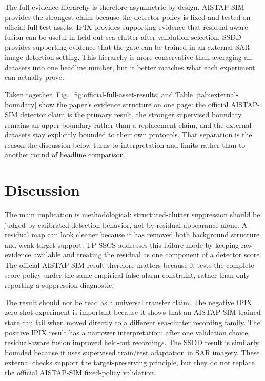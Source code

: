 \documentclass[journal]{IEEEtran}
\begin{document}
The full evidence hierarchy is therefore asymmetric by design. AISTAP-SIM provides the strongest claim because the detector policy is fixed and tested on official full-test assets. IPIX provides supporting evidence that residual-aware fusion can be useful in held-out sea clutter after validation selection. SSDD provides supporting evidence that the gate can be trained in an external SAR-image detection setting. This hierarchy is more conservative than averaging all datasets into one headline number, but it better matches what each experiment can actually prove.

Taken together, Fig.~\ref{fig:official-full-asset-results} and Table~\ref{tab:external-boundary} show the paper's evidence structure on one page: the official AISTAP-SIM detector claim is the primary result, the stronger supervised boundary remains an upper boundary rather than a replacement claim, and the external datasets stay explicitly bounded to their own protocols. That separation is the reason the discussion below turns to interpretation and limits rather than to another round of headline comparison.

\section{Discussion}

The main implication is methodological: structured-clutter suppression should be judged by calibrated detection behavior, not by residual appearance alone. A residual map can look cleaner because it has removed both background structure and weak target support. TP-SSCS addresses this failure mode by keeping raw evidence available and treating the residual as one component of a detector score. The official AISTAP-SIM result therefore matters because it tests the complete score policy under the same empirical false-alarm constraint, rather than only reporting a suppression diagnostic.

The result should not be read as a universal transfer claim. The negative IPIX zero-shot experiment is important because it shows that an AISTAP-SIM-trained state can fail when moved directly to a different sea-clutter recording family. The positive IPIX result has a narrower interpretation: after one validation choice, residual-aware fusion improved held-out recordings. The SSDD result is similarly bounded because it uses supervised train/test adaptation in SAR imagery. These external checks support the target-preserving principle, but they do not replace the official AISTAP-SIM fixed-policy validation.
\end{document}
